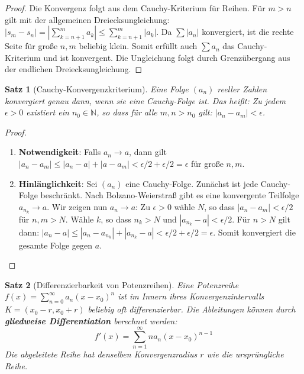 \documentclass{article}
\newtheorem{satz}{Satz}[section]
\theoremstyle{definition}
\begin{document}
\begin{proof}
Die Konvergenz folgt aus dem Cauchy-Kriterium für Reihen. Für $m > n$ gilt mit der allgemeinen Dreiecksungleichung:
$|s_m - s_n| = |\sum_{k=n+1}^m a_k| \le \sum_{k=n+1}^m |a_k|$.
Da $\sum |a_n|$ konvergiert, ist die rechte Seite für große $n, m$ beliebig klein. Somit erfüllt auch $\sum a_n$ das Cauchy-Kriterium und ist konvergent. 
Die Ungleichung folgt durch Grenzübergang aus der endlichen Dreiecksungleichung.
\end{proof}
\begin{satz}[Cauchy-Konvergenzkriterium]
Eine Folge $(a_n)$ reeller Zahlen konvergiert genau dann, wenn sie eine Cauchy-Folge ist. 
Das heißt: Zu jedem $\epsilon > 0$ existiert ein $n_0 \in \mathbb{N}$, so dass für alle $m, n > n_0$ gilt: $|a_n - a_m| < \epsilon$.


\end{satz}
\begin{proof}
\begin{enumerate}[label=\arabic*.]
    \item \textbf{Notwendigkeit}: Falls $a_n \to a$, dann gilt $|a_n - a_m| \le |a_n - a| + |a - a_m| < \epsilon/2 + \epsilon/2 = \epsilon$ für große $n, m$.

    \item \textbf{Hinlänglichkeit}: Sei $(a_n)$ eine Cauchy-Folge. 
    Zunächst ist jede Cauchy-Folge beschränkt. 
    Nach Bolzano-Weierstraß gibt es eine konvergente Teilfolge $a_{n_k} \to a$.
    Wir zeigen nun $a_n \to a$:
    Zu $\epsilon > 0$ wähle $N$, so dass $|a_n - a_m| < \epsilon/2$ für $n, m > N$.
    Wähle $k$, so dass $n_k > N$ und $|a_{n_k} - a| < \epsilon/2$.
    Für $n > N$ gilt dann:
    $|a_n - a| \le |a_n - a_{n_k}| + |a_{n_k} - a| < \epsilon/2 + \epsilon/2 = \epsilon$.
    Somit konvergiert die gesamte Folge gegen $a$.
\end{enumerate}
\end{proof}
\begin{satz}[Differenzierbarkeit von Potenzreihen]
Eine Potenzreihe $f(x) = \sum_{n=0}^\infty a_n (x-x_0)^n$ ist im Innern ihres Konvergenzintervalls $K = (x_0-r, x_0+r)$ beliebig oft differenzierbar. Die Ableitungen können durch \textbf{gliedweise Differentiation} berechnet werden:
$$f'(x) = \sum_{n=1}^\infty n a_n (x-x_0)^{n-1}$$
Die abgeleitete Reihe hat denselben Konvergenzradius $r$ wie die ursprüngliche Reihe.


\end{satz}
\end{document}
